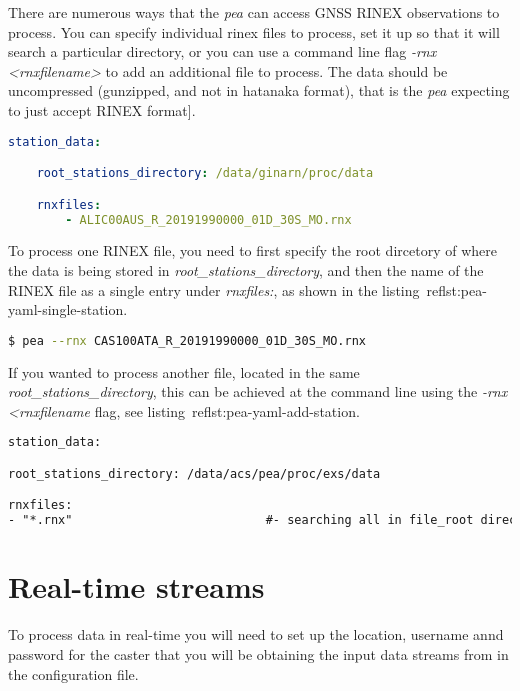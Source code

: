 There are numerous ways that the \emph{pea} can access GNSS RINEX observations to process. You can specify individual rinex files to process, set it up so that it will search a particular directory, or you can use a command line flag \emph{-rnx <rnxfilename>} to add an additional file to process. The data should be uncompressed (gunzipped, and not in hatanaka format), that is the \emph{pea} expecting to just accept RINEX format]. 
%
\begin{lstlisting}[language=yaml,caption=pea yaml processing one station example]
station_data:

	root_stations_directory: /data/ginarn/proc/data

	rnxfiles:
		- ALIC00AUS_R_20191990000_01D_30S_MO.rnx                          
\end{lstlisting}\label{lst:pea-yaml-single-station}
%
To process one RINEX file, you need to first specify the root dircetory of where the data is being stored in \emph{root\_stations\_directory}, and then the name of the RINEX file as a single entry under \emph{rnxfiles:}, as shown in the listing~ref{lst:pea-yaml-single-station}. 
%
\begin{lstlisting}[language=bash,caption=Example showing how to add a RINEX file to the processing list form the command line]
$ pea --rnx CAS100ATA_R_20191990000_01D_30S_MO.rnx
\end{lstlisting}\label{lst:pea-cmd-single-station}
%
If you wanted to process another file, located in the same \emph{root\_stations\_directory}, this can be achieved at the command line using the \emph{-rnx <rnxfilename} flag, see listing~ref{lst:pea-yaml-add-station}.
%
\begin{lstlisting}[language=xml,caption=yaml input files configuration example]
station_data:

root_stations_directory: /data/acs/pea/proc/exs/data

rnxfiles:
- "*.rnx"                           #- searching all in file_root directory
\end{lstlisting}

\section{Real-time streams}
To process data in real-time you will need to set up the location, username annd password for the caster that you will be obtaining the input data streams from in the configuration file.

